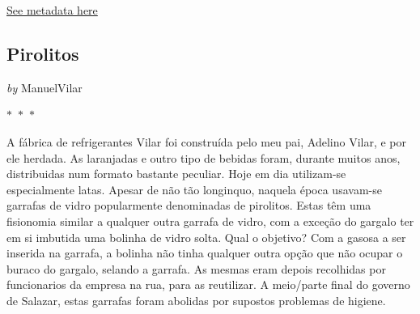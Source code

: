 
\hyperref[table:\arabic{tablecounter}]{See metadata here}

\newpage

\begin{center}

    \section{  Pirolitos  }

    
            
                \textit{by} ManuelVilar
            
        

     
    
    

$\ast$~$\ast$~$\ast$



\end{center}

\begin{center}
    \begin{minipage}{0.9\textwidth}
        \setlength{\parskip}{0.2cm}
        \setlength{\parindent}{0cm}
        \fontsize{12pt}{14pt}\selectfont
        


A fábrica de refrigerantes Vilar foi construída pelo meu pai, Adelino Vilar, e por ele
herdada. As laranjadas e outro tipo de bebidas foram, durante muitos anos, distribuidas num
formato bastante peculiar. Hoje em dia utilizam-se especialmente
latas. Apesar de não tão longinquo, naquela época usavam-se garrafas de
vidro popularmente denominadas de pirolitos. Estas têm uma fisionomia
similar a qualquer outra garrafa de vidro, com a exceção do gargalo ter
em si imbutida uma bolinha de vidro solta. Qual o objetivo? Com a gasosa
a ser inserida na garrafa, a bolinha não tinha qualquer outra opção que
não ocupar o buraco do gargalo, selando a garrafa. As mesmas eram depois
recolhidas por funcionarios da empresa na rua, para as reutilizar. A
meio/parte final do governo de Salazar, estas garrafas foram abolidas
por supostos problemas de higiene.

    \end{minipage}
\end{center}

